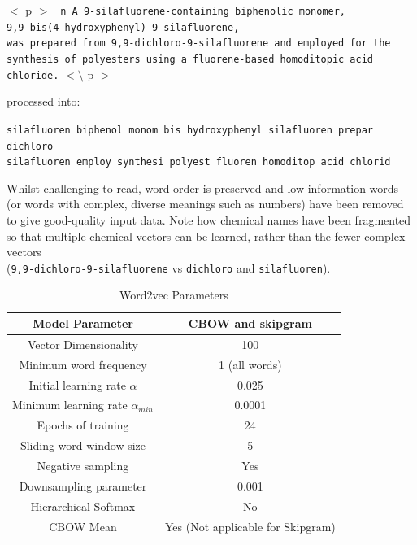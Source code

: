 $<$ p $>$
\texttt{ n A 9-silafluorene-containing biphenolic monomer,\\ 9,9-bis(4-hydroxyphenyl)-9-silafluorene,\\ was prepared from 9,9-dichloro-9-silafluorene and employed for the \\synthesis of polyesters using a fluorene-based homoditopic acid chloride.} $< \setminus$ p $>$ \cite{sanex} 

processed into:

\texttt{silafluoren biphenol monom bis hydroxyphenyl silafluoren prepar dichloro\\ silafluoren employ synthesi polyest fluoren homoditop acid chlorid}

Whilst challenging to read, word order is preserved and low information words (or words with complex, diverse meanings such as numbers) have been removed to give good-quality input data. Note how chemical names have been fragmented so that multiple chemical vectors can be learned, rather than the fewer complex vectors \\ (\texttt{9,9-dichloro-9-silafluorene} vs \texttt{dichloro} and \texttt{silafluoren}).
\newpage
\begin{table}[H]
\begin{center}
\caption{Word2vec Parameters}
\label{tab:hyperparams}

\begin{tabular}{||c|c||}
\hline
Model Parameter &CBOW and skipgram\\
\hline
Vector Dimensionality & 100\\
Minimum word frequency & 1 (all words)\\
Initial learning rate $\alpha$ & 0.025 \\
Minimum learning rate $\alpha_{min}$&0.0001\\
Epochs of training & 24\\
Sliding word window size & 5\\
Negative sampling & Yes \\
Downsampling parameter & 0.001\\
Hierarchical Softmax & No\\
CBOW Mean & Yes (Not applicable for Skipgram) \\
\hline
\end{tabular}
\end{center}
\end{table}


